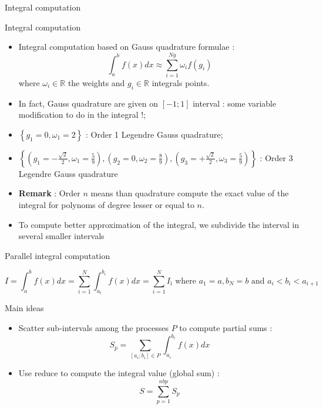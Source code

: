 \documentclass[compress,10pt,aspectratio=169]{beamer}
\begin{document}
\begin{frame}[fragile]{Integral computation}
  \scriptsize
  \begin{block}{\small Integral computation}
    \begin{itemize}
    \item Integral computation based on Gauss quadrature formulae :
      \[
      \int_{a}^{b}f(x)dx \approx \sum_{i=1}^{Ng} \omega_{i}f(g_{i})
      \]
      where $\omega_{i}\in\mathbb{R}$ the weights  and $g_{i}\in\mathbb{R}$ integrals points.
    \item In fact, Gauss quadrature are given on $[-1;1]$ interval : some variable modification to do in the integral !;
    \item $\left\{ g_{1}=0, \omega_{1}=2 \right\}$ : Order 1 Legendre Gauss quadrature;
    \item $\left\{ \left( g_{1}=-\frac{\sqrt{2}}{2}, \omega_{1}=\frac{5}{9} \right), \left( g_{2}=0, \omega_{2}=\frac{8}{9} \right), \left( g_{3}=+\frac{\sqrt{2}}{2}, \omega_{3}=\frac{5}{9} \right) \right\}$ : Order 3 Legendre Gauss quadrature
    \item \textbf{Remark} : Order $n$ means than quadrature compute the exact value of the integral for polynoms of degree lesser or equal to $n$.
    \item To compute better approximation of the integral, we subdivide the interval in several smaller intervals
    \end{itemize}
  \end{block}
\end{frame}

\begin{frame}[fragile]{Parallel integral computation}
  \scriptsize
  \begin{center}
    \[
    I = \int_{a}^{b}f(x)dx = \sum_{i=1}^{N}\int_{a_{i}}^{b_{i}}f(x)dx = \sum_{i=1}^{N} I_{î} \mbox{ where } a_{1}=a, b_{N} = b\mbox{ and } a_{i} < b_{i} < a_{i+1}
    \]
  \end{center}
  \begin{block}{\small Main ideas}
    \begin{itemize}
  \item Scatter sub-intervals among the processes $P$ to compute partial sums :
    \[
    S_{p} = \sum_{[a_{i};b_{i}] \in P} \int_{a_{i}}^{b_{i}} f(x)dx
    \]
  \item Use reduce to compute the integral value (global sum) :
    \[ S = \sum_{p=1}^{nbp} S_{p} \]
    \end{itemize}
  \end{block}
\end{frame}
\end{document}
